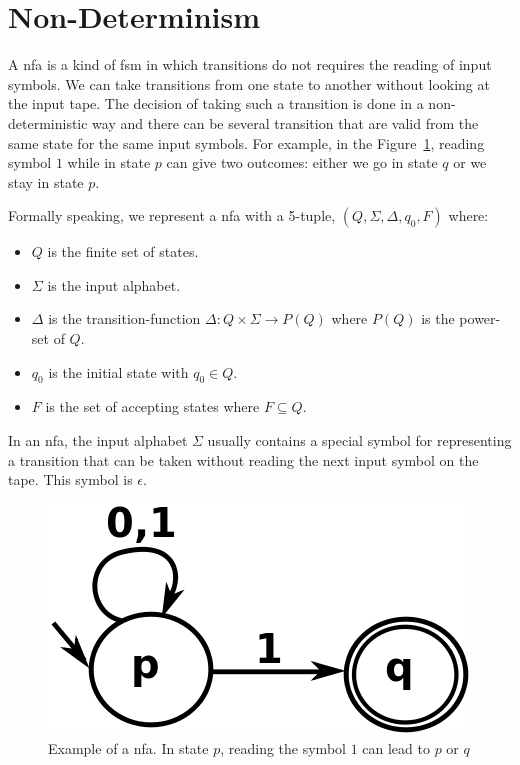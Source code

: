 \documentclass[12pt]{article}
\theoremstyle{definition}
\theoremstyle{definition}
\theoremstyle{remark}
\begin{document}

\section{Non-Determinism}


A \gls{nfa} is a kind of \gls{fsm} in which transitions do not requires the reading of input symbols. We can take transitions from one state to another without looking at the input tape. The decision of taking such a transition is done in a non-deterministic way and there can be several transition that are valid from the same state for the same input symbols. For example, in the Figure~\ref{nfa}, reading symbol $1$ while in state $p$ can give two outcomes: either we go in state $q$ or we stay in state $p$.~\cite{FA-DecisionProblems:1959}

Formally speaking, we represent a \gls{nfa} with a 5-tuple, $(Q, \Sigma, \Delta, q_0, F)$ where:

\begin{itemize}
\item $Q$ is the finite set of states.
\item $\Sigma$ is the input alphabet.
\item $\Delta$ is the transition-function $\Delta: Q \times \Sigma \rightarrow P(Q)$ where $P(Q)$ is the power-set of $Q$.
\item $q_0$ is the initial state with $q_0 \in Q$.
\item $F$ is the set of accepting states where $F \subseteq Q$.
\end{itemize}

In an \gls{nfa}, the input alphabet $\Sigma$ usually contains a special symbol for representing a transition that can be taken without reading the next input symbol on the tape. This symbol is $\epsilon$.\\

\begin{figure}
    \centering
    \includegraphics[scale=0.4]{graph/nfa.png}
    \caption{Example of a \gls{nfa}. In state $p$, reading the symbol $1$ can lead to $p$ or $q$~\cite{NFA:2017}}
    \label{nfa}
\end{figure}
\end{document}
